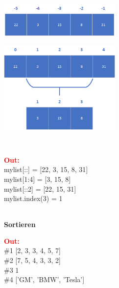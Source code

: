 	\begin{minipage}[h]{6cm}
		\includegraphics[width=6cm,align=t]{pics/Listen/indexing_neg.png}
	\end{minipage}
	\begin{minipage}[h]{6cm}
		\includegraphics[width=6cm,align=t]{pics/Listen/slicing.png}
	\end{minipage}
	\\
	\begin{minipage}[h]{10cm}
		
	\end{minipage}
	\begin{minipage}[h]{8cm}
		\textcolor{red}{\textbf{Out:}}
		\\mylist[::] = [22, 3, 15, 8, 31]
		\\mylist[1:4] = [3, 15, 8]
		\\mylist[::2] = [22, 15, 31]
		\\mylist.index(3) = 1
	\end{minipage}
	\vspace{0.5cm}
	\\\textbf{Sortieren}
	\vspace{0.1cm}
	\\
	\begin{minipage}[h]{10cm}
		
	\end{minipage}
	\begin{minipage}[h]{8cm}
		\textcolor{red}{\textbf{Out:}}
		\\\#1 [2, 3, 3, 4, 5, 7]
		\\\#2 [7, 5, 4, 3, 3, 2]
		\\\#3 1
		\\\#4 ['GM', 'BMW', 'Tesla']
	\end{minipage}
